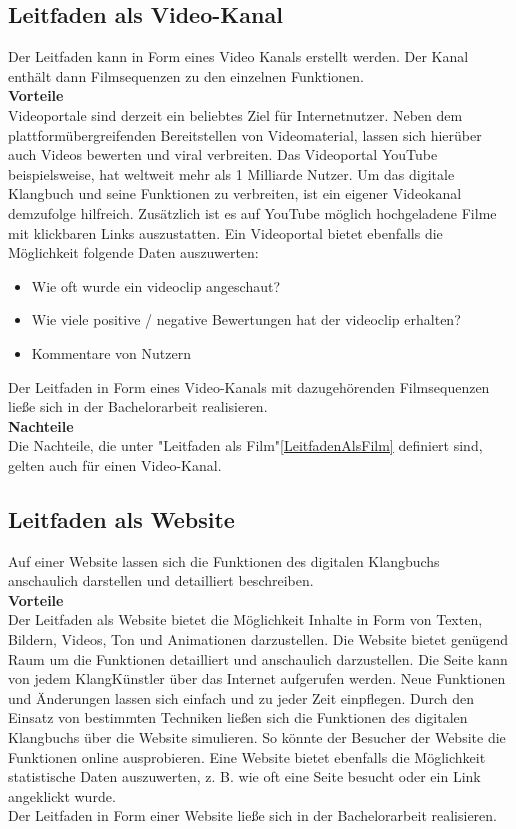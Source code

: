 

\subsection{Leitfaden als Video-Kanal}
Der Leitfaden kann in Form eines Video Kanals erstellt werden. Der Kanal enthält dann Filmsequenzen zu den einzelnen Funktionen.\\

\textbf{Vorteile}\\
Videoportale sind derzeit ein beliebtes Ziel für Internetnutzer. Neben dem plattformübergreifenden Bereitstellen von Videomaterial, lassen sich hierüber auch Videos bewerten und \gls{viral} verbreiten. Das Videoportal YouTube beispielsweise, hat weltweit mehr als 1 Milliarde Nutzer.\cite{YT} Um das digitale Klangbuch und seine Funktionen zu verbreiten, ist ein eigener Videokanal demzufolge hilfreich. Zusätzlich ist es auf YouTube möglich hochgeladene Filme mit klickbaren Links auszustatten. Ein Videoportal bietet ebenfalls die Möglichkeit folgende Daten auszuwerten:
\begin{itemize}
\item Wie oft wurde ein \gls{videoclip} angeschaut?
\item Wie viele positive / negative Bewertungen hat der \gls{videoclip} erhalten?
\item Kommentare von Nutzern
\end{itemize}
Der Leitfaden in Form eines Video-Kanals mit dazugehörenden Filmsequenzen ließe sich in der Bachelorarbeit realisieren.\\

\textbf{Nachteile}\\
Die Nachteile, die unter "Leitfaden als Film"\ref{LeitfadenAlsFilm} definiert sind, gelten auch für einen Video-Kanal.



\subsection{Leitfaden als Website}
Auf einer Website lassen sich die Funktionen des digitalen Klangbuchs anschaulich darstellen und detailliert beschreiben.\\

\textbf{Vorteile}\label{VorteileWebsite}\\
Der Leitfaden als Website bietet die Möglichkeit Inhalte in Form von Texten, Bildern, Videos, Ton und Animationen darzustellen. Die Website bietet genügend Raum um die Funktionen detailliert und anschaulich darzustellen. Die Seite kann von jedem KlangKünstler über das Internet aufgerufen werden. Neue Funktionen und Änderungen lassen sich einfach und zu jeder Zeit einpflegen. Durch den Einsatz von bestimmten Techniken ließen sich die Funktionen des digitalen Klangbuchs über die Website simulieren. So könnte der Besucher der Website die Funktionen online ausprobieren. Eine Website bietet ebenfalls die Möglichkeit statistische Daten auszuwerten, z. B. wie oft eine Seite besucht oder ein Link angeklickt wurde.\\Der Leitfaden in Form einer Website ließe sich in der Bachelorarbeit realisieren.\\ 

